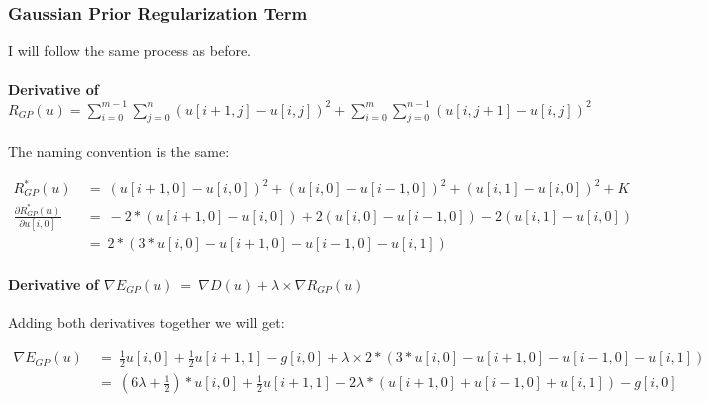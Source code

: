 \documentclass{report}
\begin{document}
			\subsubsection{Gaussian Prior Regularization Term}
			\startsubsection
				I will follow the same process as before.
				\vspace{-0.4cm} \paragraph{Derivative of $R_{GP}(u) = \sum_{i=0}^{m-1} \sum_{j=0}^{n} ( u[i+1,j] - u[i,j] )^2 + \sum_{i=0}^{m} \sum_{j=0}^{n-1} ( u[i,j+1] - u[i,j] )^2$}
				\startsubsection
					\vspace{0.2cm} The naming convention is the same:
				\closesection
				\begin{adjustwidth}{-4em}{}
					\vspace{-0.5cm}
					\begin{align*}
						R_{GP}^*(u) \ & = \ (u[i+1,0] - u[i,0])^2 + (u[i,0] - u[i-1,0])^2 + (u[i,1] - u[i,0])^2 + K \\
						\frac{\partial R_{GP}^*(u)}{\partial u[i,0]} \ & = \ -2 * (u[i+1,0] - u[i,0]) + 2 (u[i,0] - u[i-1,0]) - 2 (u[i,1] - u[i,0]) \\
						& = \ 2 * (3 * u[i,0] - u[i+1,0] - u[i-1,0] - u[i,1])
					\end{align*}
				\end{adjustwidth}
				\vspace{-0.4cm} \paragraph{Derivative of $\nabla E_{GP}(u) \ = \ \nabla D(u) + \lambda \times \nabla R_{GP}(u)$}
				\startsubsection
					Adding both derivatives together we will get:
				\closesection
				\begin{adjustwidth}{-7em}{}
					\vspace{-0.6cm}
					\begin{align*}
						\nabla E_{GP}(u) \ & = \ \frac{1}{2} u[i,0]  + \frac{1}{2} u[i+1,1] - g[i,0] + \lambda \times 2 * (3 * u[i,0] - u[i+1,0] - u[i-1,0] - u[i,1]) \\
						& = \ (6 \lambda + \frac{1}{2}) * u[i,0]  + \frac{1}{2} u[i+1,1] - 2\lambda*(u[i+1,0] + u[i-1,0] + u[i,1]) - g[i,0]
					\end{align*}
				\end{adjustwidth}
			\closesection
\end{document}

